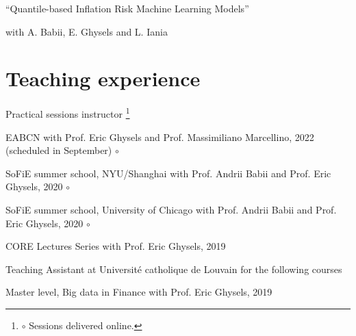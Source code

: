 \documentclass[10pt]{article}
\newcommand\blfootnote[1]{%
	\begingroup
	\renewcommand\thefootnote{}\footnote{#1}%
	\addtocounter{footnote}{-1}%
	\endgroup
}
\newcommand{\thecircle}{{\Large{\color{blue}$\circ$} }}
\newcommand{\thecirclenogap}{{\Large{\color{blue}$\circ$}}}
\begin{document}
	\hspace{1em}``Quantile-based Inﬂation Risk Machine Learning Models''

	\smallskip
	
	\vspace{-0.5em}
	
	\hspace{2em}{\small(supersedes ``Quantile-based Inﬂation Risk Models'')}
	
	\hspace{2em} with A. Babii, E. Ghysels and L. Iania
	
	
	
	\section*{Teaching experience}
	\vspace{-0.5em}
	
	\hspace{1em} Practical sessions instructor\blfootnote{\thecircle Sessions delivered online.} 
	
	\hspace{2em} EABCN with Prof. Eric Ghysels and Prof. Massimiliano Marcellino, 2022 (scheduled in September) \thecirclenogap
	
	\hspace{2em} SoFiE summer school, NYU/Shanghai with Prof. Andrii Babii and Prof. Eric Ghysels, 2020 \thecirclenogap
	
	\hspace{2em} SoFiE summer school, University of Chicago with Prof. Andrii Babii and Prof. Eric Ghysels, 2020 \thecirclenogap
	
	\hspace{2em} CORE Lectures Series with Prof. Eric Ghysels, 2019
	
	\smallskip
	
	\newpage 
	
	\hspace{1em} Teaching Assistant at Universit\'e catholique de Louvain for the following courses
	
	\hspace{2em} Master level, Big data in Finance with Prof. Eric Ghysels, 2019
	
\end{document}
